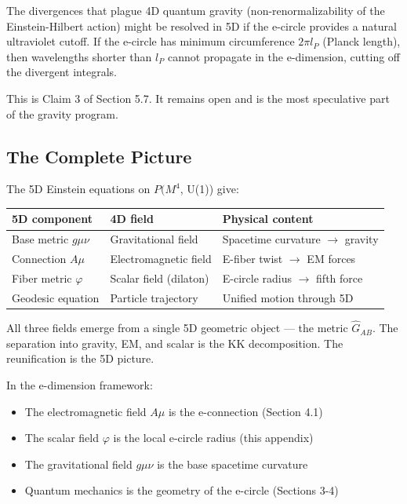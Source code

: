 \documentclass[aps,prd,preprint,superscriptaddress,longbibliography,floatfix]{revtex4-2}
\theoremstyle{remark}
\begin{document}
The divergences that plague 4D quantum gravity (non-renormalizability of the Einstein-Hilbert action) might be resolved in 5D if the e-circle provides a natural ultraviolet cutoff. If the e-circle has minimum circumference $2\pi l_P$ (Planck length), then wavelengths shorter than $l_P$ cannot propagate in the e-dimension, cutting off the divergent integrals.

This is Claim 3 of Section 5.7. It remains open and is the most speculative part of the gravity program.



\subsection{The Complete Picture}

The 5D Einstein equations on $P(M^{4}$, U(1)) give:


\begin{table}[H]
\begin{ruledtabular}
\begin{tabular}{p{5.0cm}p{5.0cm}p{5.0cm}}
5D component & 4D field & Physical content \\
\hline
Base metric $g\mu\nu$ & Gravitational field & Spacetime curvature $\to$ gravity \\
Connection $A\mu$ & Electromagnetic field & E-fiber twist $\to$ EM forces \\
Fiber metric $\varphi$ & Scalar field (dilaton) & E-circle radius $\to$ fifth force \\
Geodesic equation & Particle trajectory & Unified motion through 5D \\
\end{tabular}
\end{ruledtabular}
\end{table}

All three fields emerge from a single 5D geometric object --- the metric $\hat{G}_{AB}$. The separation into gravity, EM, and scalar is the KK decomposition. The reunification is the 5D picture.

In the e-dimension framework:

\begin{itemize}
  \item The electromagnetic field $A\mu$ is the e-connection (Section 4.1)
  \item The scalar field $\varphi$ is the local e-circle radius (this appendix)
  \item The gravitational field $g\mu\nu$ is the base spacetime curvature
  \item Quantum mechanics is the geometry of the e-circle (Sections 3-4)
\end{itemize}
\end{document}
